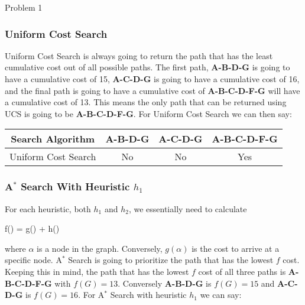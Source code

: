 \begin{problem}{Problem 1}
\begin{highlight}
        \subsubsection*{Uniform Cost Search}

        Uniform Cost Search is always going to return the path that has the least cumulative cost out of all possible paths. The first path, \textbf{A-B-D-G} is going to have a cumulative cost of 15, 
        \textbf{A-C-D-G} is going to have a cumulative cost of 16, and the final path is going to have a cumulative cost of \textbf{A-B-C-D-F-G} will have a cumulative cost of 13. This means the only path
        that can be returned using UCS is going to be \textbf{A-B-C-D-F-G}. For Uniform Cost Search we can then say:

        \begin{center}
            \begin{tabular}[h]{|c|c|c|c|}
                \hline Search Algorithm & \textbf{A-B-D-G} & \textbf{A-C-D-G} & \textbf{A-B-C-D-F-G} \\ \hline
                Uniform Cost Search & No & No & Yes \\ \hline
            \end{tabular}            
        \end{center}

        \subsubsection*{A$^{*}$ Search With Heuristic $h_{1}$}

        For each heuristic, both $h_{1}$ and $h_{2}$, we essentially need to calculate 

        \begin{center}
            \begin{highlightbox}
                f(\alpha) = g(\alpha) + h(\alpha)
            \end{highlightbox}
        \end{center}
        where $\alpha$ is a node in the graph. Conversely, $g(\alpha)$ is the cost to arrive at a specific node. A$^{*}$ Search is going to prioritize the path that has the lowest $f$ cost. Keeping this in mind,
        the path that has the lowest $f$ cost of all three paths is \textbf{A-B-C-D-F-G} with $f(G) = 13$. Conversely \textbf{A-B-D-G} is $f(G) = 15$ and \textbf{A-C-D-G} is $f(G) = 16$. For A$^{*}$ Search with 
        heuristic $h_{1}$ we can say:


\end{highlight}
\end{problem}
